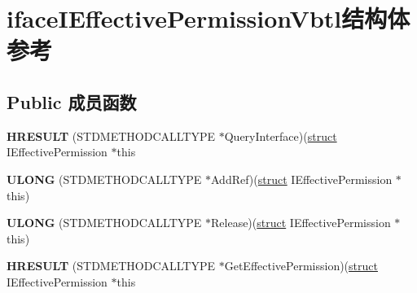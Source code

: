 \hypertarget{structiface_i_effective_permission_vbtl}{}\section{iface\+I\+Effective\+Permission\+Vbtl结构体 参考}
\label{structiface_i_effective_permission_vbtl}
\subsection*{Public 成员函数}
\begin{DoxyCompactItemize}
\item 
\mbox{\label{structiface_i_effective_permission_vbtl_a9a1029f3993068f74bf863bc5034d36e}} 
{\bfseries H\+R\+E\+S\+U\+LT} (S\+T\+D\+M\+E\+T\+H\+O\+D\+C\+A\+L\+L\+T\+Y\+PE $\ast$Query\+Interface)(\hyperlink{interfacestruct}{struct} I\+Effective\+Permission $\ast$this
\item 
\mbox{\label{structiface_i_effective_permission_vbtl_ad00cb3d0ebebd1c0fa17ad864fac23cf}} 
{\bfseries U\+L\+O\+NG} (S\+T\+D\+M\+E\+T\+H\+O\+D\+C\+A\+L\+L\+T\+Y\+PE $\ast$Add\+Ref)(\hyperlink{interfacestruct}{struct} I\+Effective\+Permission $\ast$this)
\item 
\mbox{\label{structiface_i_effective_permission_vbtl_a63c6e0034be1205336e312ab998a7435}} 
{\bfseries U\+L\+O\+NG} (S\+T\+D\+M\+E\+T\+H\+O\+D\+C\+A\+L\+L\+T\+Y\+PE $\ast$Release)(\hyperlink{interfacestruct}{struct} I\+Effective\+Permission $\ast$this)
\item 
\mbox{\label{structiface_i_effective_permission_vbtl_aefdd87a59154c418bf362e41a2eb9ce9}} 
{\bfseries H\+R\+E\+S\+U\+LT} (S\+T\+D\+M\+E\+T\+H\+O\+D\+C\+A\+L\+L\+T\+Y\+PE $\ast$Get\+Effective\+Permission)(\hyperlink{interfacestruct}{struct} I\+Effective\+Permission $\ast$this
\end{DoxyCompactItemize}
